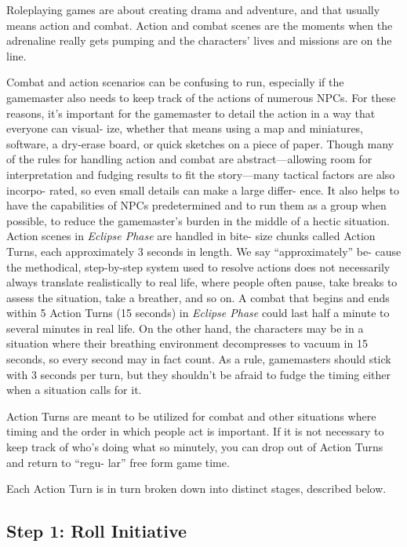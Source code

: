 Roleplaying games are about creating drama and 
adventure, and that usually means action and 
combat. Action and combat scenes are the moments 
when the adrenaline really gets pumping and the 
characters' lives and missions are on the line.

Combat and action scenarios can be confusing 
to run, especially if the gamemaster also needs to 
keep track of the actions of numerous NPCs. For 
these reasons, it's important for the gamemaster to 
detail the action in a way that everyone can visual-
ize, whether that means using a map and miniatures, 
software, a dry-erase board, or quick sketches on 
a piece of paper. Though many of the rules for 
handling action and combat are abstract—allowing 
room for interpretation and fudging results to fit 
the story—many tactical factors are also incorpo-
rated, so even small details can make a large differ-
ence. It also helps to have the capabilities of NPCs 
predetermined and to run them as a group when 
possible, to reduce the gamemaster's burden in the 
middle of a hectic situation.
Action scenes in \textit{Eclipse Phase} are handled in bite-
size chunks called Action Turns, each approximately 
3 seconds in length. We say ``approximately'' be-
cause the methodical, step-by-step system used to 
resolve actions does not necessarily always translate 
realistically to real life, where people often pause, 
take breaks to assess the situation, take a breather, 
and so on. A combat that begins and ends within 5 
Action Turns (15 seconds) in \textit{Eclipse Phase} could 
last half a minute to several minutes in real life. On 
the other hand, the characters may be in a situation 
where their breathing environment decompresses to 
vacuum in 15 seconds, so every second may in fact 
count. As a rule, gamemasters should stick with 3 
seconds per turn, but they shouldn't be afraid to 
fudge the timing either when a situation calls for it.

Action Turns are meant to be utilized for combat 
and other situations where timing and the order in 
which people act is important. If it is not necessary 
to keep track of who's doing what so minutely, you 
can drop out of Action Turns and return to ``regu-
lar'' free form game time.

Each Action Turn is in turn broken down into 
distinct stages, described below.

\subsection{Step 1: Roll Initiative}

